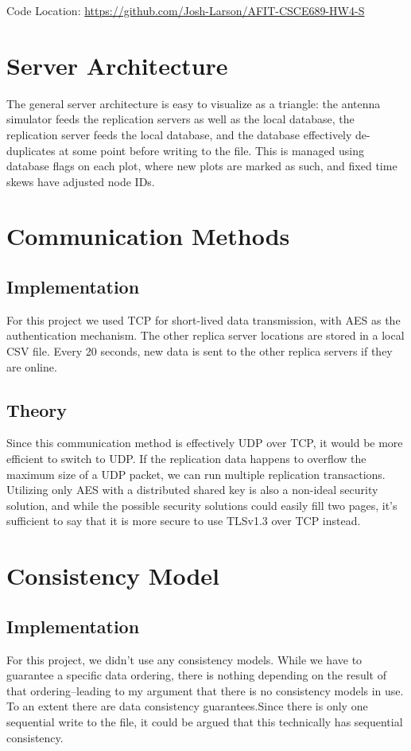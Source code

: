 \documentclass{article}
\begin{document}
\noindent Code Location: \url{https://github.com/Josh-Larson/AFIT-CSCE689-HW4-S}
\begin{multicols*}{2}

\section{Server Architecture}
The general server architecture is easy to visualize as a triangle: the antenna simulator feeds the replication servers as well as the local database, the replication server feeds the local database, and the database effectively de-duplicates at some point before writing to the file.  This is managed using database flags on each plot, where new plots are marked as such, and fixed time skews have adjusted node IDs.

\section{Communication Methods}
\subsection{Implementation}
For this project we used TCP for short-lived data transmission, with AES as the authentication mechanism.  The other replica server locations are stored in a local CSV file.  Every 20 seconds, new data is sent to the other replica servers if they are online.

\subsection{Theory}
Since this communication method is effectively UDP over TCP, it would be more efficient to switch to UDP.  If the replication data happens to overflow the maximum size of a UDP packet, we can run multiple replication transactions.  Utilizing only AES with a distributed shared key is also a non-ideal security solution, and while the possible security solutions could easily fill two pages, it's sufficient to say that it is more secure to use TLSv1.3 over TCP instead.

\section{Consistency Model}
\subsection{Implementation}
\indent For this project, we didn't use any consistency models.  While we have to guarantee a specific data ordering, there is nothing depending on the result of that ordering--leading to my argument that there is no consistency models in use.  To an extent there are data consistency guarantees.Since there is only one sequential write to the file, it could be argued that this technically has sequential consistency.


\end{multicols*}
\end{document}
